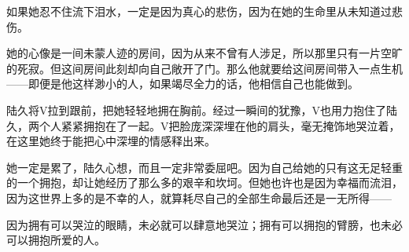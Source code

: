 如果她忍不住流下泪水，一定是因为真心的悲伤，因为在她的生命里从未知道过悲伤。

她的心像是一间未蒙人迹的房间，因为从来不曾有人涉足，所以那里只有一片空旷的死寂。但这间房间此刻却向自己敞开了门。那么他就要给这间房间带入一点生机——即便是他这样渺小的人，如果竭尽全力的话，他相信自己也能做到。

陆久将V拉到跟前，把她轻轻地拥在胸前。经过一瞬间的犹豫，V也用力抱住了陆久，两个人紧紧拥抱在了一起。V把脸庞深深埋在他的肩头，毫无掩饰地哭泣着，在这里她终于能把心中深埋的情感释出来。

她一定是累了，陆久心想，而且一定非常委屈吧。因为自己给她的只有这无足轻重的一个拥抱，却让她经历了那么多的艰辛和坎坷。但她也许也是因为幸福而流泪，因为这世界上多的是不幸的人，就算耗尽自己的全部生命最后还是一无所得——

因为拥有可以哭泣的眼睛，未必就可以肆意地哭泣；拥有可以拥抱的臂膀，也未必可以拥抱所爱的人。